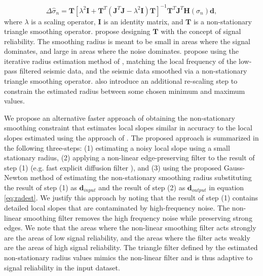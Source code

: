 \begin{equation}
\Delta\hat{\sigma}_{n}=\mathbf{T}[\lambda^2\mathbf{I}+\mathbf{T}^T(\mathbf{J}^T\mathbf{J}-\lambda^2\mathbf{I})\mathbf{T}]^{-1}\mathbf{T}^T\mathbf{J}^T\mathbf{H}(\sigma_n)\mathbf{d},
\label{eq:slopeshap}
\end{equation}
where $\lambda$ is a scaling operator, $\mathbf{I}$ is an identity matrix, and $\mathbf{T}$ is a non-stationary triangle smoothing operator. 
\cite{wang2021} propose designing $\mathbf{T}$ with the concept of signal reliability. The smoothing radius is meant to be small in areas where the signal dominates, and large in areas where the noise dominates. \cite{wang2021} propose using the iterative radius estimation method of \cite{greerfomel2018}, matching the local frequency of the low-pass filtered seismic data, and the seismic data smoothed via a non-stationary triangle smoothing operator. \cite{wang2021} also introduce an additional re-scaling step to constrain the estimated radius between some chosen minimum and maximum values. 

We propose an alternative faster approach of obtaining the non-stationary smoothing constraint that estimates local slopes similar in accuracy to the local slopes estimated using the approach of \cite{wang2021}. The proposed approach is summarized in the following three-steps: (1) estimating a noisy local slope using a small stationary radius, (2) applying a non-linear edge-preserving filter to the result of step (1) (e.g. fast explicit diffusion filter \cite[]{grewenig2010}), and (3) using the proposed Gauss-Newton method of estimating the non-stationary smoothing radius substituting the result of step (1) as $\mathbf{d}_{input}$ and the result of step (2) as $\mathbf{d}_{output}$ in equation \ref{eq:radest}. We justify this approach by noting that the result of step (1) contains detailed local slopes that are contaminated by high-frequency noise. The non-linear smoothing filter removes the high frequency noise while preserving strong edges. We note that the areas where the non-linear smoothing filter acts strongly are the areas of low signal reliability, and the areas where the filter acts weakly are the areas of high signal reliability. The triangle filter defined by the estimated non-stationary radius values mimics the non-linear filter and is thus adaptive to signal reliability in the input dataset.  

